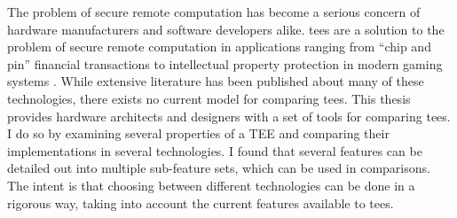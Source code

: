 The problem of secure remote computation has become a serious concern of hardware manufacturers and software developers alike. \glspl{tee} are a solution to the problem of secure remote computation in applications ranging from ``chip and pin'' financial transactions \cite{679731} to intellectual property protection in modern gaming systems \cite{da2018securing}. While extensive literature has been published about many of these technologies, there exists no current model for comparing \glspl{tee}. This thesis provides hardware architects and designers with a set of tools for comparing \glspl{tee}. I do so by examining several properties of a TEE and comparing their implementations in several technologies. I found that several features can be detailed out into multiple sub-feature sets, which can be used in comparisons. The intent is that choosing between different technologies can be done in a rigorous way, taking into account the current features available to \glspl{tee}.
